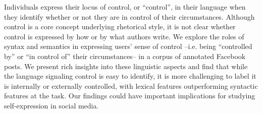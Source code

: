 Individuals express their locus of control, or ``control'', in their language when they identify whether or not they are in control of their circumstances. Although control is a core concept underlying rhetorical style, it is not clear whether control is expressed by how or by what authors write. We explore the roles of syntax and semantics in expressing users' sense of control --i.e. being ``controlled by'' or ``in control of'' their circumstances-- in a corpus of annotated Facebook posts. We present rich insights into these linguistic aspects and find that while the language signaling control is easy to identify, it is more challenging to label it is internally or externally controlled, with lexical features outperforming syntactic features at the task. Our findings could have important implications for studying self-expression in social media.
